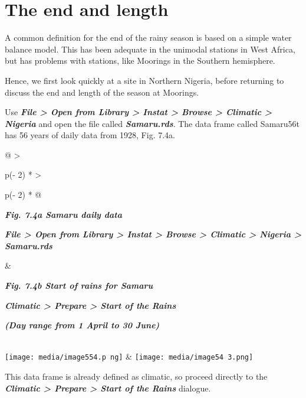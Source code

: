 \documentclass[
  letterpaper,
  DIV=11,
  numbers=noendperiod]{scrreprt}
\begin{document}
\section{The end and length}\label{the-end-and-length}

A common definition for the end of the rainy season is based on a simple
water balance model. This has been adequate in the unimodal stations in
West Africa, but has problems with stations, like Moorings in the
Southern hemisphere.

Hence, we first look quickly at a site in Northern Nigeria, before
returning to discuss the end and length of the season at Moorings.

Use \textbf{\emph{File \textgreater{} Open from Library \textgreater{}
Instat \textgreater{} Browse \textgreater{} Climatic \textgreater{}
Nigeria}} and open the file called \textbf{\emph{Samaru.rds}}. The data
frame called Samaru56t has 56 years of daily data from 1928, Fig. 7.4a.

\begin{longtable}[]{@{}
  >{\raggedright\arraybackslash}p{(\columnwidth - 2\tabcolsep) * }
  >{\raggedright\arraybackslash}p{(\columnwidth - 2\tabcolsep) * }@{}}
\toprule\noalign{}
\begin{minipage}[b]{\linewidth}\raggedright
\textbf{\emph{Fig. 7.4a Samaru daily data}}

\textbf{\emph{File \textgreater{} Open from Library \textgreater{}
Instat \textgreater{} Browse \textgreater{} Climatic \textgreater{}
Nigeria \textgreater{} Samaru.rds}}
\end{minipage} & \begin{minipage}[b]{\linewidth}\raggedright
\textbf{\emph{Fig. 7.4b Start of rains for Samaru}}

\textbf{\emph{Climatic \textgreater{} Prepare \textgreater{} Start of
the Rains}}

\textbf{\emph{(Day range from 1 April to 30 June)}}
\end{minipage} \\
\midrule\noalign{}
\endhead
\bottomrule\noalign{}
\endlastfoot
\texttt{[image: media/image554.p ng]}
&
\texttt{[image: media/image54 3.png]} \\
\end{longtable}

This data frame is already defined as climatic, so proceed directly to
the \textbf{\emph{Climatic \textgreater{} Prepare \textgreater{} Start
of the Rains}} dialogue.
\end{document}
